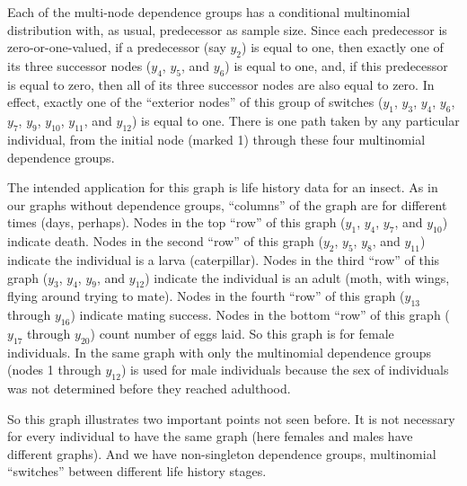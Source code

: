 Each of the multi-node dependence groups has a conditional multinomial
distribution with, as usual, predecessor as sample size.  Since each
predecessor is zero-or-one-valued, if a predecessor (say $y_2$) is
equal to one, then exactly one of its three successor nodes ($y_4$, $y_5$,
and $y_6$) is equal to one, and, if this predecessor
is equal to zero, then all of its three successor nodes are also equal to zero.
In effect, exactly one of the ``exterior nodes'' of this group of switches
($y_1$, $y_3$, $y_4$, $y_6$, $y_7$, $y_9$, $y_{10}$, $y_{11}$, and $y_{12}$)
is equal to one.  There is one path taken by any particular individual,
from the initial node (marked 1) through these four multinomial dependence
groups.

The intended application for this graph \citep[as in][]{aster-hornworm}
is life history
data for an insect.  As in our graphs without dependence groups,
``columns'' of the graph are for different
times (days, perhaps).
Nodes in the top ``row'' of this graph ($y_1$, $y_4$, $y_7$, and $y_{10}$)
indicate death.
Nodes in the second ``row'' of this graph ($y_2$, $y_5$, $y_8$, and $y_{11}$)
indicate the individual is a larva (caterpillar).
Nodes in the third ``row'' of this graph ($y_3$, $y_4$, $y_9$, and $y_{12}$)
indicate the individual is an adult (moth, with wings, flying around trying
to mate).
Nodes in the fourth ``row'' of this graph ($y_{13}$ through $y_{16}$)
indicate mating success.
Nodes in the bottom ``row'' of this graph ($y_{17}$ through $y_{20}$)
count number of eggs laid.  So this graph is for female individuals.
In \citet{aster-hornworm} the same graph with only the multinomial dependence
groups (nodes 1 through $y_{12}$) is used for male individuals because
the sex of individuals was not determined before they reached adulthood.

So this graph illustrates two important points not seen before.
It is not necessary for every individual to
have the same graph (here females and males have different graphs).
And we have non-singleton dependence groups,
multinomial ``switches'' between different life history stages.


